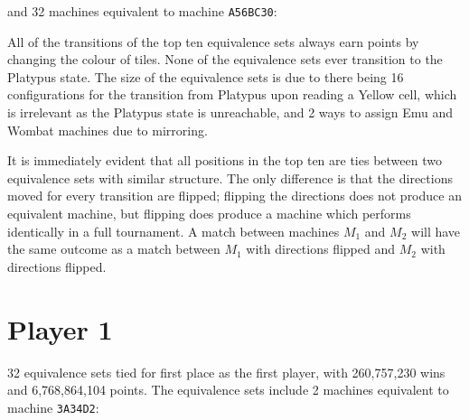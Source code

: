 \noindent and 32 machines equivalent to machine \texttt{A56BC30}:


All of the transitions of the top ten equivalence sets always earn points
by changing the colour of tiles. None of the equivalence sets ever transition to
the Platypus state. The size of the equivalence sets is due to there being 16
configurations for the transition from Platypus upon reading a Yellow cell,
which is irrelevant as the Platypus state is unreachable, and 2 ways to assign
Emu and Wombat machines due to mirroring.

It is immediately evident that all positions in the top ten are ties between
two equivalence sets with similar structure. The only difference is that the
directions moved for every transition are flipped;
flipping the directions does not produce an equivalent machine, but flipping does
produce a machine which performs identically in a full tournament. A
match between machines $M_1$ and $M_2$ will have the same outcome as a
match between $M_1$ with directions flipped and $M_2$ with directions flipped.

\section{Player 1}

32 equivalence sets tied for first place as the first player, with
260,757,230 wins and 6,768,864,104 points. The equivalence sets include 2
machines equivalent to machine \texttt{3A34D2}:

